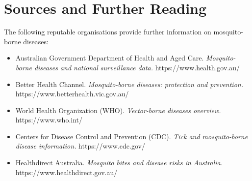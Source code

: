 \section*{Sources and Further Reading}
The following reputable organisations provide further information on mosquito-borne diseases:
\begin{itemize}
    \item Australian Government Department of Health and Aged Care. \textit{Mosquito-borne diseases and national surveillance data.} https://www.health.gov.au/
    \item Better Health Channel. \textit{Mosquito-borne diseases: protection and prevention.} https://www.betterhealth.vic.gov.au/
    \item World Health Organization (WHO). \textit{Vector-borne diseases overview.} https://www.who.int/
    \item Centers for Disease Control and Prevention (CDC). \textit{Tick and mosquito-borne disease information.} https://www.cdc.gov/
    \item Healthdirect Australia. \textit{Mosquito bites and disease risks in Australia.} https://www.healthdirect.gov.au/
\end{itemize}
